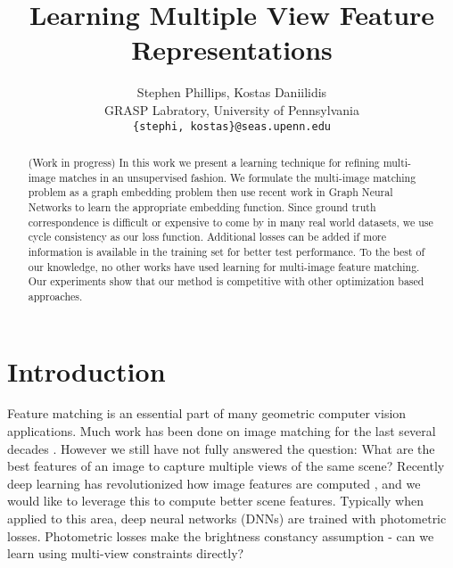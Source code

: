 \documentclass[10pt,twocolumn,letterpaper]{article}
\begin{document}
\title{Learning Multiple View Feature Representations}

\author{Stephen Phillips, Kostas Daniilidis \\
GRASP Labratory, University of Pennsylvania\\
{\tt\small \{stephi, kostas\}@seas.upenn.edu}
}

\maketitle


\begin{abstract}
   (Work in progress) In this work we present a learning technique for refining multi-image matches in an unsupervised fashion.
   We formulate the multi-image matching problem as a graph embedding problem then use recent work in Graph Neural Networks to learn the appropriate embedding function.
   Since ground truth correspondence is difficult or expensive to come by in many real world datasets, we use cycle consistency as our loss function.
   Additional losses can be added if more information is available in the training set for better test performance.
   To the best of our knowledge, no other works have used learning for multi-image feature matching.
   Our experiments show that our method is competitive with other optimization based approaches.
\end{abstract}

\section{Introduction}

Feature matching is an essential part of many geometric computer vision applications.
Much work has been done on image matching for the last several decades \cite{fischler1981random}.
However we still have not fully answered the question: What are the best features of an image to capture multiple views of the same scene?
Recently deep learning has revolutionized how image features are computed \cite{yi2016lift}, and we would like to leverage this to compute better scene features.
Typically when applied to this area, deep neural networks (DNNs) are trained with photometric losses.
Photometric losses make the brightness constancy assumption - can we learn using multi-view constraints directly?
\end{document}
